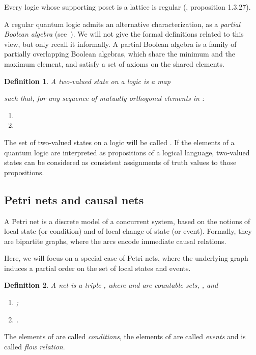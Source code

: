 \documentclass{eptcs}
\newtheorem{definition}{Definition}
\begin{document}
Every logic whose supporting poset is a lattice is regular
(\cite{PP91}, proposition 1.3.27).

A regular quantum logic admits an alternative characterization,
as a \emph{partial Boolean algebra} (see~\cite{H89}).
We will not give the formal definitions related to this view,
but only recall it informally.
A partial Boolean algebra is a family of partially overlapping
Boolean algebras, which share the minimum and the maximum
element, and satisfy a set of axioms on the shared elements.

\begin{definition} \cite{PP91}
A \emph{two-valued state} on a logic  is a map

such that, for any sequence 
of mutually orthogonal elements in :
\begin{enumerate}
  \item 
  \item 
\end{enumerate}
\end{definition}

The set of two-valued states on a logic  will be called
.
If the elements of a quantum logic are interpreted as propositions
of a logical language, two-valued states can be considered as
consistent assignments of truth values to those propositions.
\subsection{Petri nets and causal nets}\label{s:nets}
A Petri net is a discrete model of a concurrent system, based on
the notions of local state (or condition) and of local change of
state (or event). Formally, they are bipartite graphs, where the
arcs encode immediate causal relations.

Here, we will focus on a special case of Petri nets, where the
underlying graph induces a partial order on the set of local states
and events.
\begin{definition} \label{d:net}
  A \emph{net} is a triple , where
   and  are countable sets,
  , and
  \begin{enumerate}
    \item ;
    \item .
  \end{enumerate}
\end{definition}

The elements of  are called \emph{conditions}, the elements of 
are called \emph{events} and  is called \emph{flow relation}.  
\end{document}
